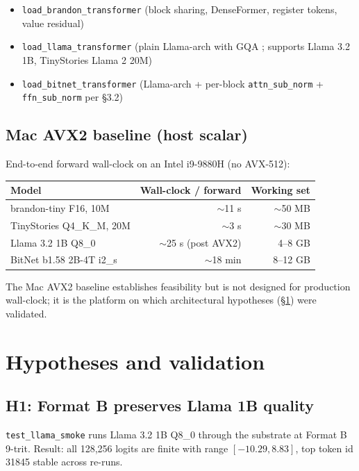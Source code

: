 \documentclass{article}
\begin{document}
\begin{itemize}
  \item \texttt{load\_brandon\_transformer} (block sharing,
    {DenseFormer}, register tokens, value residual)
  \item \texttt{load\_llama\_transformer} (plain Llama-arch with
    {GQA} \citep{gqa-2023}; supports Llama 3.2 1B, TinyStories Llama 2 20M)
  \item \texttt{load\_bitnet\_transformer} (Llama-arch + per-block
    \texttt{attn\_sub\_norm} + \texttt{ffn\_sub\_norm} per
    \citep{bitnet158-2024} \S 3.2)
\end{itemize}

\subsection{Mac AVX2 baseline (host scalar)}

End-to-end forward wall-clock on an Intel i9-9880H (no AVX-512):

\begin{table}[h]
\centering
\begin{tabular}{lrr}
\toprule
Model & Wall-clock / forward & Working set \\
\midrule
brandon-tiny F16, 10M & $\sim$11 s & $\sim$50 MB \\
TinyStories Q4\_K\_M, 20M & $\sim$3 s & $\sim$30 MB \\
Llama 3.2 1B Q8\_0 & $\sim$25 s (post AVX2) & 4--8 GB \\
BitNet b1.58 2B-4T i2\_s & $\sim$18 min & 8--12 GB \\
\bottomrule
\end{tabular}
\end{table}

The Mac {AVX2} baseline establishes feasibility but is not designed
for production wall-clock; it is the platform on which architectural
hypotheses ({\S}\ref{sec:hypotheses}) were validated.

\section{Hypotheses and validation} \label{sec:hypotheses}

\subsection{H1: Format B preserves Llama 1B quality}

\texttt{test\_llama\_smoke} runs Llama 3.2 1B Q8\_0 through the
substrate at Format B 9-trit. Result: all 128{,}256 logits are finite
with range $[-10.29, 8.83]$, top token id 31845 stable across re-runs.
\end{document}
